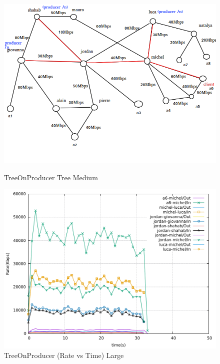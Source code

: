 \begin{figure}[H]

\begin{center}

\includegraphics[scale = 0.5]{Figures/TreeOnProducer_big.png}

\caption{TreeOnProducer Tree Medium} \label{TreeOnProducer_big} 


\includegraphics[scale = 0.5]{Figures/TreeOnProducer_big.pdf}

\caption{TreeOnProducer (Rate vs Time) Large} \label{treeonproducer_big} 


\end{center}

\end{figure}


